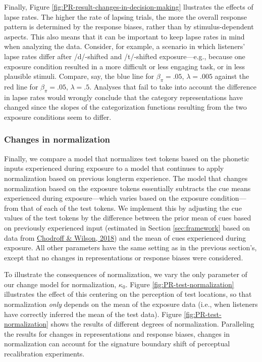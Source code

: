 \documentclass[
  11pt,
  english,
  man,floatsintext]{apa6}
\begin{document}
Finally, Figure \ref{fig:PR-result-changes-in-decision-making} llustrates the effects of lapse rates. The higher the rate of lapsing trials, the more the overall response pattern is determined by the response biases, rather than by stimulus-dependent aspects. This also means that it can be important to keep lapse rates in mind when analyzing the data. Consider, for example, a scenario in which listeners' lapse rates differ after /d/-shifted and /t/-shifted exposure---e.g., because one exposure condition resulted in a more difficult or less engaging task, or in less plausible stimuli. Compare, say, the blue line for \(\beta_{\pi} = .05\), \(\lambda = .005\) against the red line for \(\beta_{\pi} = .05\), \(\lambda = .5\). Analyses that fail to take into account the difference in lapse rates would wrongly conclude that the category representations have changed since the slopes of the categorization functions resulting from the two exposure conditions seem to differ.

\hypertarget{changes-in-normalization}{%
\subsubsection{Changes in normalization}\label{changes-in-normalization}}

Finally, we compare a model that normalizes test tokens based on the phonetic inputs experienced during exposure to a model that continues to apply normalization based on previous longterm experience. The model that changes normalization based on the exposure tokens essentially subtracts the cue means experienced during exposure---which varies based on the exposure condition---from that of each of the test tokens. We implement this by adjusting the cue values of the test tokens by the difference between the prior mean of cues based on previously experienced input (estimated in Section \ref{sec:framework} based on data from \protect\hyperlink{ref-chodroff-wilson2018}{Chodroff \& Wilson, 2018}) and the mean of cues experienced during exposure. All other parameters have the same setting as in the previous section's, except that no changes in representations or response biases were considered.

To illustrate the consequences of normalization, we vary the only parameter of our change model for normalization, \(\kappa_0\). Figure \ref{fig:PR-test-normalization} illustrates the effect of this centering on the perception of test locations, so that normalization \emph{only} depends on the mean of the exposure data (i.e., when listeners have correctly inferred the mean of the test data). Figure \ref{fig:PR-test-normalization} shows the results of different degrees of normalization. Paralleling the results for changes in representations and response biases, changes in normalization can account for the signature boundary shift of perceptual recalibration experiments.
\end{document}
